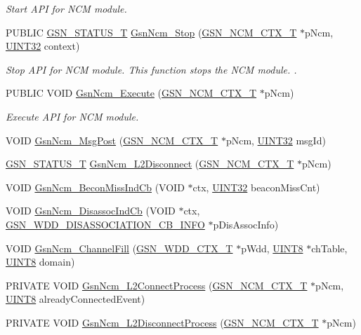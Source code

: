 \begin{DoxyCompactItemize}
\begin{DoxyCompactList}\small\item\em Start API for NCM module. \end{DoxyCompactList}\item 
PUBLIC \hyperlink{a00659_gae36517c0f5872426a7034c9551eb96ac}{GSN\_\-STATUS\_\-T} \hyperlink{a00688_ga36427555e14041e449831a66dfe58c39}{GsnNcm\_\-Stop} (\hyperlink{a00158}{GSN\_\-NCM\_\-CTX\_\-T} $\ast$pNcm, \hyperlink{a00660_gae1e6edbbc26d6fbc71a90190d0266018}{UINT32} context)
\begin{DoxyCompactList}\small\item\em Stop API for NCM module. This function stops the NCM module. . \end{DoxyCompactList}\item 
PUBLIC VOID \hyperlink{a00688_ga3ed4d28d4f2a8195d6c37f5032ee0bbd}{GsnNcm\_\-Execute} (\hyperlink{a00158}{GSN\_\-NCM\_\-CTX\_\-T} $\ast$pNcm)
\begin{DoxyCompactList}\small\item\em Execute API for NCM module. \end{DoxyCompactList}\item 
VOID \hyperlink{a00529_abd7dadd35e85f09d6227e80e9a75290a}{GsnNcm\_\-MsgPost} (\hyperlink{a00158}{GSN\_\-NCM\_\-CTX\_\-T} $\ast$pNcm, \hyperlink{a00660_gae1e6edbbc26d6fbc71a90190d0266018}{UINT32} msgId)
\item 
\hyperlink{a00659_gae36517c0f5872426a7034c9551eb96ac}{GSN\_\-STATUS\_\-T} \hyperlink{a00529_af3880755f0a49f23616ae321836388a0}{GsnNcm\_\-L2Disconnect} (\hyperlink{a00158}{GSN\_\-NCM\_\-CTX\_\-T} $\ast$pNcm)
\item 
VOID \hyperlink{a00529_a7fa16651dadcb00c43cba00489532392}{GsnNcm\_\-BeconMissIndCb} (VOID $\ast$ctx, \hyperlink{a00660_gae1e6edbbc26d6fbc71a90190d0266018}{UINT32} beaconMissCnt)
\item 
VOID \hyperlink{a00529_a6de95d07431b057ab399dffcd3e2acd2}{GsnNcm\_\-DisassocIndCb} (VOID $\ast$ctx, \hyperlink{a00379}{GSN\_\-WDD\_\-DISASSOCIATION\_\-CB\_\-INFO} $\ast$pDisAssocInfo)
\item 
VOID \hyperlink{a00529_a14368355956e7acc3bd676d7f3954c5e}{GsnNcm\_\-ChannelFill} (\hyperlink{a00108}{GSN\_\-WDD\_\-CTX\_\-T} $\ast$pWdd, \hyperlink{a00660_gab27e9918b538ce9d8ca692479b375b6a}{UINT8} $\ast$chTable, \hyperlink{a00660_gab27e9918b538ce9d8ca692479b375b6a}{UINT8} domain)
\item 
PRIVATE VOID \hyperlink{a00529_a2313f4fa85fed24072bc2e1a07e94449}{GsnNcm\_\-L2ConnectProcess} (\hyperlink{a00158}{GSN\_\-NCM\_\-CTX\_\-T} $\ast$pNcm, \hyperlink{a00660_gab27e9918b538ce9d8ca692479b375b6a}{UINT8} alreadyConnectedEvent)
\item 
PRIVATE VOID \hyperlink{a00529_a020a013b462b810d9a0ee50b8ba96dd0}{GsnNcm\_\-L2DisconnectProcess} (\hyperlink{a00158}{GSN\_\-NCM\_\-CTX\_\-T} $\ast$pNcm)
\end{DoxyCompactItemize}


